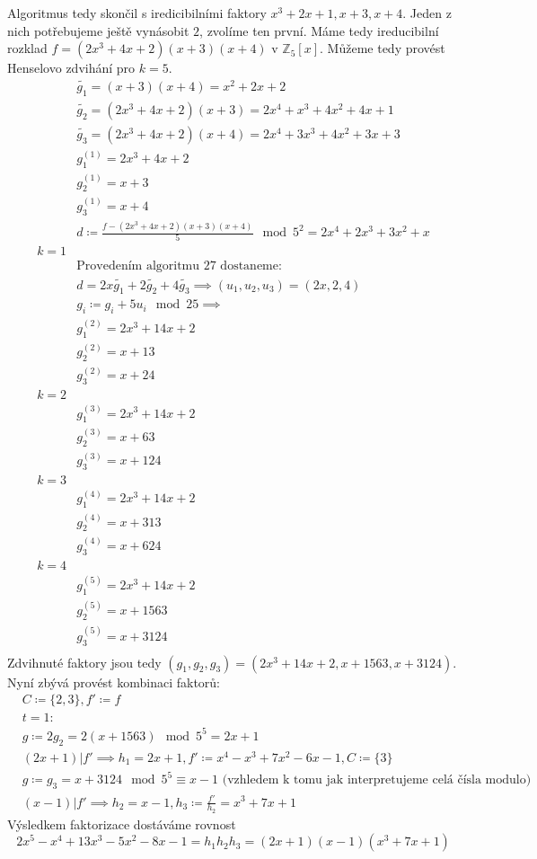 \documentclass[11pt, a4paper]{article}
\begin{document}
Algoritmus tedy skončil s iredicibilními faktory $x^3+2x+1, x+3, x+4$. Jeden z nich potřebujeme ještě vynásobit $2$, zvolíme ten první. Máme tedy ireducibilní rozklad $f=(2x^3+4x+2)(x+3)(x+4)$ v $\mathbb{Z}_5[x]$. Můžeme tedy provést Henselovo zdvihání pro $k=5$.
\begin{align*}
&\tilde{g_1} = (x+3)(x+4)=x^2+2x+2\\
&\tilde{g_2} = (2x^3+4x+2)(x+3)=2x^4+x^3+4x^2+4x+1\\
&\tilde{g_3} = (2x^3+4x+2)(x+4)=2x^4+3x^3+4x^2+3x+3\\
&g_1^{(1)} = 2x^3+4x+2\\
&g_2^{(1)}  = x+3\\
&g_3^{(1)}  = x+4\\
&d \coloneqq \frac{f-(2x^3+4x+2)(x+3)(x+4)}{5} \mod 5^2 = 2x^4+2x^3+3x^2+x\\
k=1\\
&\text{Provedením algoritmu 27 dostaneme:}\\
&d=2x\tilde{g_1}+2\tilde{g_2}+4\tilde{g_3} \implies (u_1,u_2,u_3) = (2x,2,4)\\
&g_i \coloneqq g_i+5u_i \mod 25 \implies\\
&g_1^{(2)}  = 2x^3+14x+2\\
&g_2^{(2)}  = x+13\\
&g_3^{(2)}  = x+24\\
k=2\\
&g_1^{(3)}  = 2x^3+14x+2\\
&g_2^{(3)}  = x+63\\
&g_3^{(3)}  = x+124\\
k=3\\
&g_1^{(4)}  = 2x^3+14x+2\\
&g_2^{(4)}  = x+313\\
&g_3^{(4)}  = x+624\\
k=4\\
&g_1^{(5)}  = 2x^3+14x+2\\
&g_2^{(5)}  = x+1563\\
&g_3^{(5)}  = x+3124\\
\end{align*}
Zdvihnuté faktory jsou tedy $(g_1,g_2,g_3)=(2x^3+14x+2, x+1563, x+3124)$. Nyní zbývá provést kombinaci faktorů:
\begin{align*}
&C\coloneqq \{2,3\}, f' \coloneqq f\\
&t=1:\\
&g\coloneqq 2 g_2 = 2(x+1563) \mod 5^5 = 2x+1\\
&(2x+1)|f' \implies h_1 = 2x+1, f' \coloneqq x^4-x^3+7x^2-6x-1, C \coloneqq \{3\}\\
&g \coloneqq g_3 = x+3124 \mod 5^5 \equiv x-1 \text{ (vzhledem k tomu jak interpretujeme celá čísla modulo)}\\
&(x-1)|f' \implies h_2 = x-1, h_3 \coloneqq \frac{f'}{h_2} = x^3+7x+1
\end{align*}
Výsledkem faktorizace dostáváme rovnost
\[
 2 x^5 - x^4 + 13 x^3 - 5 x^2 - 8 x - 1 = h_1h_2h_3 = (2x+1)(x-1)(x^3+7x+1)
\]
\end{document}
